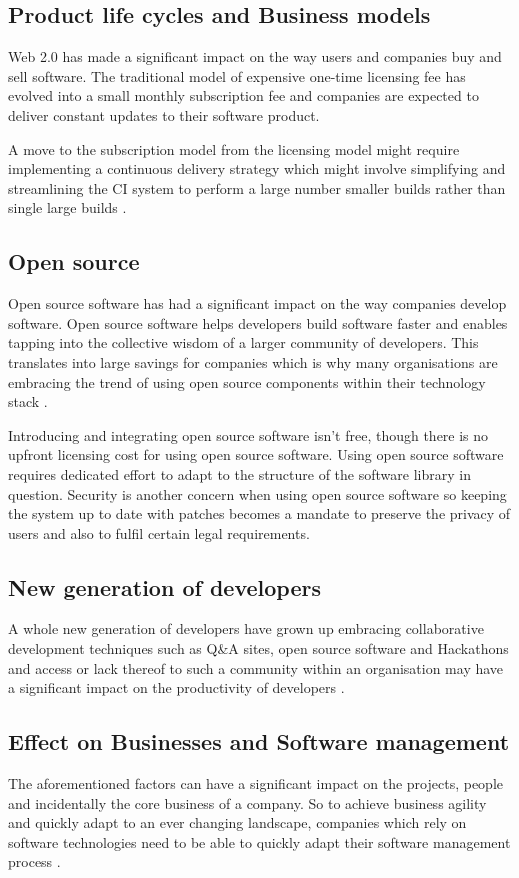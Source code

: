 \subsection*{Product life cycles and Business models}

Web 2.0 has made a significant impact on the way users and companies buy and sell software. The traditional model of expensive one-time licensing fee has evolved into a small monthly subscription fee and companies are expected to deliver constant updates to their software product. 

A move to the subscription model from the licensing model might require implementing a continuous delivery strategy which might involve simplifying and streamlining the CI system to perform a large number smaller builds rather than single large builds \cite{schief_transforming_2012} \cite{di_valentin_measuring_2012}.


\subsection*{Open source}

Open source software has had a significant impact on the way companies develop software. Open source software helps developers build software faster and enables tapping into the collective wisdom of a larger community of developers. This translates into large savings for companies which is why many organisations are embracing the trend of using open source components within their technology stack \cite{baldwin_4_2014} \cite{lemmens_open_2008}.

Introducing and integrating open source software isn't free, though there is no upfront licensing cost for using open source software. Using open source software requires dedicated effort to adapt to the structure of the software library in question. Security is another concern when using open source software so keeping the system up to date with patches becomes a mandate to preserve the privacy of users and also to fulfil certain legal requirements.

\subsection*{New generation of developers}

A whole new generation of developers have grown up embracing collaborative development techniques such as Q\&A sites, open source software and Hackathons and access or lack thereof to such a community within an organisation may have a significant impact on the productivity of developers \cite{vasilescu_continuous_2014}. 


\subsection*{Effect on Businesses and Software management}

The aforementioned factors can have a significant impact on the projects, people and incidentally the core business of a company. So to achieve business agility and quickly adapt to an ever changing landscape, companies which rely on software technologies need to be able to quickly adapt their software management process \cite{mathiassen_business_2006}.
